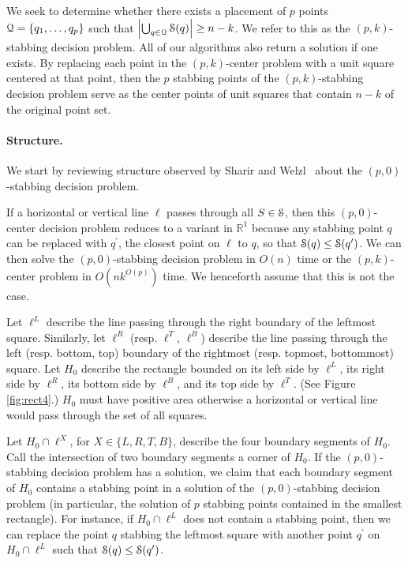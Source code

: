 \documentclass[11pt]{myclass}
\renewcommand{\b}[1]{\ensuremath{\mathbb{#1}}}
\newcommand{\EuS}{\ensuremath{\EuScript{S}}}
\newcommand{\EuQ}{\ensuremath{\EuScript{Q}}}
\begin{document}
We seek to determine whether there exists a placement of $p$ points $\EuQ = \{q_1, \ldots, q_p\}$ such that $\left| \bigcup_{q \in \EuQ} \EuS(q) \right| \geq n-k$.  
We refer to this as the $(p,k)$-stabbing decision problem.  
All of our algorithms also return a solution if one exists.  
By replacing each point in the $(p,k)$-center problem with a unit square centered at that point, then the $p$ stabbing points of the $(p,k)$-stabbing decision problem serve as the center points of unit squares that contain $n-k$ of the original point set.  


\paragraph{Structure.}
We start by reviewing structure observed by Sharir and Welzl~\cite{SW96} about the $(p,0)$-stabbing decision problem.  

If a horizontal or vertical line $\ell$ passes through all $S \in \EuS$, then this $(p,0)$-center decision problem reduces to a variant in $\b{R}^1$ because any stabbing point $q$ can be replaced with $q^\prime$, the closest point on $\ell$ to $q$, so that $\EuS(q) \leq \EuS(q^\prime)$.  We can then solve the $(p,0)$-stabbing decision problem in $O(n)$ time or the $(p,k)$-center problem in $O(n k^{O(p)})$ time.  
We henceforth assume that this is not the case.  

Let $\ell^L$ describe the line passing through the right boundary of the leftmost square.  Similarly, let $\ell^R$ (resp. $\ell^T$, $\ell^B$) describe the line passing through the left (resp. bottom, top) boundary of the rightmost (resp. topmost, bottommost) square.  
Let $H_0$ describe the rectangle bounded on its left side by $\ell^L$, its right side by $\ell^R$, its bottom side by $\ell^B$, and its top side by $\ell^T$.  (See Figure \ref{fig:rect4}.)
$H_0$ must have positive area otherwise a horizontal or vertical line would pass through the set of all squares.  

Let $H_0 \cap \ell^X$, for $X \in \{L,R,T,B\}$, describe the four boundary segments of $H_0$.  Call the intersection of two boundary segments a corner of $H_0$.  
If the $(p,0)$-stabbing decision problem has a solution, we claim that each boundary segment of $H_0$ contains a stabbing point in a solution of the $(p,0)$-stabbing decision problem (in particular, the solution of $p$ stabbing points contained in the smallest rectangle).  For instance, if $H_0 \cap \ell^L$ does not contain a stabbing point, then we can replace the point $q$ stabbing the leftmost square with another point $q^\prime$ on $H_0 \cap \ell^L$ such that $\EuS(q) \leq \EuS(q^\prime)$.  
\end{document}
